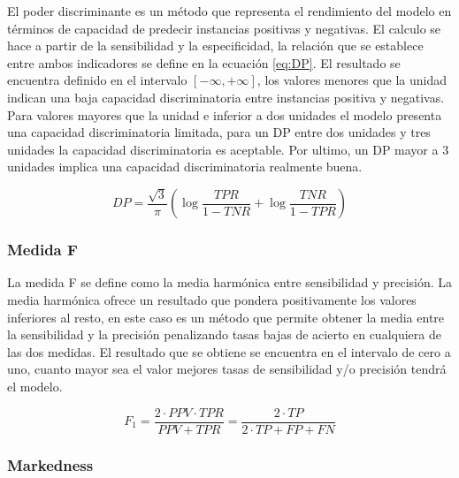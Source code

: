 El poder discriminante \cite{DP2006} es un método que representa el rendimiento del modelo en términos de capacidad de predecir instancias positivas y negativas. El calculo se hace a partir de la sensibilidad y la especificidad, la relación que se establece entre ambos indicadores se define en la ecuación \ref{eq:DP}. El resultado se encuentra definido en el intervalo $[-\infty, +\infty]$, los valores menores que la unidad indican una baja capacidad discriminatoria entre instancias positiva y negativas. Para valores mayores que la unidad e inferior a dos unidades el modelo presenta una capacidad discriminatoria limitada, para un DP entre dos unidades y tres unidades la capacidad discriminatoria es aceptable. Por ultimo, un DP mayor a 3 unidades implica una capacidad discriminatoria realmente buena.

\bigbreak

\begin{equation}
    DP = \frac{\sqrt{3}}{\pi}(\log{\frac{TPR}{1-TNR}}+\log{\frac{TNR}{1-TPR}})
    \label{eq:DP}
\end{equation}


\subsubsection{Medida F}

La medida F se define como la media harmónica entre sensibilidad y precisión. La media harmónica ofrece un resultado que pondera positivamente los valores inferiores al resto, en este caso es un método que permite obtener la media entre la sensibilidad y la precisión penalizando tasas bajas de acierto en cualquiera de las dos medidas. El resultado que se obtiene se encuentra en el intervalo de cero a uno, cuanto mayor sea el valor mejores tasas de sensibilidad y/o precisión tendrá el modelo.

\bigbreak

\begin{equation}
    F_{1} = \frac{2 \cdot PPV \cdot TPR}{PPV+TPR} = \frac{2 \cdot TP}{2 \cdot TP + FP + FN}
    \label{eq:FSCORE}
\end{equation}


\subsubsection{Markedness}

